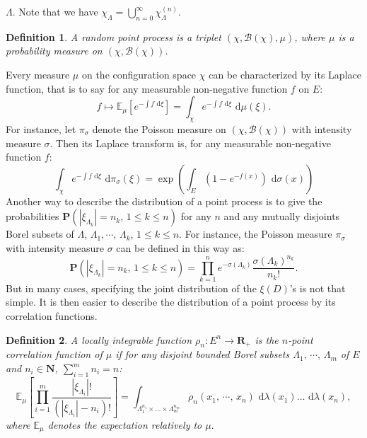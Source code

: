 \documentclass[11pt,a4paper]{amsart}
\newtheorem{Definition}{Definition}
\begin{document}
$\Lambda$.  Note that we have
$\chi_{\Lambda}=\bigcup_{n=0}^{\infty}\chi_{\Lambda}^{(n)}$.
\begin{Definition}
  A random point process is a triplet $(\chi,\mathcal{B}(\chi),\mu)$,
  where $\mu$ is a probability measure on $(\chi,\mathcal{B}(\chi))$.
\end{Definition}
Every measure $\mu$ on the configuration space $\chi$ can be
characterized by its Laplace function, that is to say for any
measurable non-negative function $f$ on $E$:
\begin{equation*}
  f\longmapsto \mathbb{E}_{\mu}[e^{-\int{f {\text{ d}}\xi}}]=\int_{\chi}e^{-\int{f {\text{ d}}\xi}}{\text{ d}}\mu(\xi).
\end{equation*}
For instance, let $\pi_{\sigma}$ denote the Poisson measure on $(\chi,
\mathcal{B}(\chi))$ with intensity measure $\sigma$. Then its Laplace
transform is, for any measurable non-negative function $f$:
\begin{equation*}
  \int_{\chi}e^{-\int{f {\text{ d}}\xi}}{\text{ d}}\pi_{\sigma}(\xi)=\exp\left(\int_E(1-e^{-f(x)}){\text{ d}}\sigma(x)\right)
\end{equation*}
Another way to describe the distribution of a point process is to give
the probabilities ${{\mathbf P}}(|\xi_{\Lambda_k}|=n_k, \, 1 \le k \le n )$ for
any $n$ and any mutually disjoints Borel subsets of $\Lambda$,
$\Lambda_1,\cdots,\, \Lambda_k$, $1 \le k \le n$.  For instance, the
Poisson measure $\pi_{\sigma}$ with intensity measure $\sigma$ can be
defined in this way as:
\begin{equation*}
  {{\mathbf P}}(|\xi_{\Lambda_k}|=n_k, \, 1 \le k \le n )=\prod_{k=1}^{n}e^{-\sigma(\Lambda_k)}\frac{\sigma(\Lambda_k)^{n_k}}{n_k!}.
\end{equation*}
But in many cases, specifying the joint distribution of the $\xi(D)$'s
is not that simple. It is then easier to describe the distribution of
a point process by its correlation functions.
\begin{Definition}
  A locally integrable function $\rho_n: E^n\rightarrow{{\mathbf R}}_{+}$ is the
  $n$-point correlation function of $\mu$ if for any disjoint bounded
  Borel subsets $\Lambda_1,\, \cdots,\, \Lambda_m$ of $E$ and $n_i \in
  {{\mathbf N}}$, $\sum_{i=1}^{m}n_i=n$:
  \begin{equation*}
    \mathbb{E}_{\mu}\left[\prod_{i=1}^{m}{\dfrac{|\xi_{\Lambda_i}|!}{(|\xi_{\Lambda_i}|-n_i)!}}\right]=\int_{\Lambda_1^{n_1}\times\ldots\times\Lambda_m^{n_m}}{\rho_n(x_1,\,
      \cdots,\, x_n){\text{ d}}\lambda(x_1)\ldots{\text{ d}}\lambda(x_n)},
  \end{equation*}
  where $\mathbb{E}_{\mu}$ denotes the expectation relatively to
  $\mu.$
\end{Definition}
\end{document}
